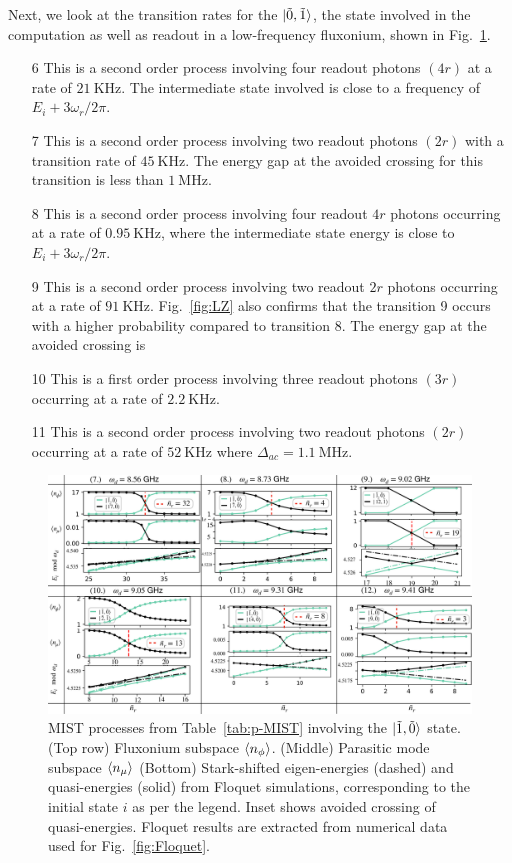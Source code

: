 \documentclass[%
reprint,
superscriptaddress,
 amsmath,amssymb,
 aps,
 prx,
longbibliography,
floatfix,
]{revtex4-2}
\begin{document}
Next, we look at the transition rates for the $\ket{\tilde{0},\tilde{1}}$, the state involved in the computation as well as readout in a low-frequency fluxonium, shown in Fig.~\ref{fig:Trans1}.
\begin{itemize}
    \item[6] This is a second order process involving four readout photons $(4r)$ at a rate of $21 \ \mathrm{KHz}$. The intermediate state involved is close to a frequency of $E_i+3\omega_r/2\pi$.
    \item[7] This is a second order process involving two readout photons $(2r)$ with a transition rate of $45 \ \mathrm{KHz}$. The energy gap at the avoided crossing for this transition is less than $1 \ \mathrm{MHz}$. 
    \item[8] This is a second order process involving four readout $4r$ photons occurring at a rate of $0.95 \ \mathrm{KHz}$, where the intermediate state energy is close to $E_i+3\omega_r/2\pi$. 
    \item[9] This is a second order process involving two readout $2r$ photons occurring at a rate of $91 \ \mathrm{KHz}$. Fig.~\ref{fig:LZ} also confirms that the transition 9 occurs with a higher probability compared to transition 8. The energy gap at the avoided crossing is
    \item[10] This is a first order process involving three readout photons $(3r)$ occurring at a rate of $2.2 \ \mathrm{KHz}$. 
    \item[11] This is a second order process involving two readout photons $(2r)$ occurring at a rate of $52 \ \mathrm{KHz}$ where $\Delta_{ac}=1.1 \ \mathrm{MHz}$.
\end{itemize}
\begin{figure}
    \centering
    \includegraphics[width=1.0\textwidth]{Figures/Trans1.pdf}
    \caption{MIST processes from Table~\ref{tab:p-MIST} involving the $\ket{\tilde{1},\tilde{0}}$ state. (Top row) Fluxonium subspace $\braket{n_\phi}$. (Middle) Parasitic mode subspace $\braket{n_\mu}$ (Bottom) Stark-shifted eigen-energies (dashed) and quasi-energies (solid) from Floquet simulations, corresponding to the initial state $i$ as per the legend. Inset shows avoided crossing of quasi-energies. Floquet results are extracted from numerical data used for Fig.~\ref{fig:Floquet}.}
    \label{fig:Trans1}
\end{figure}
\end{document}
